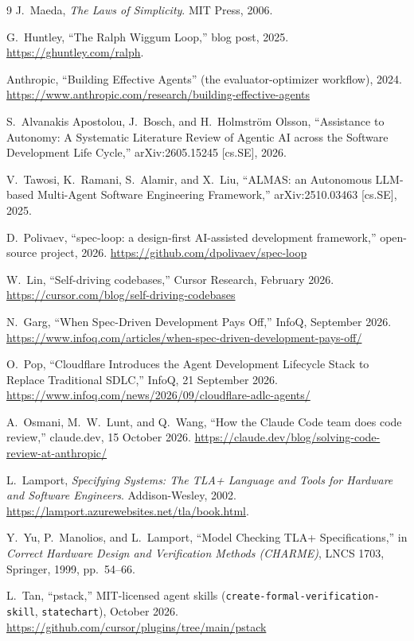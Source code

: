 \documentclass[11pt]{article}
\begin{document}
\begin{thebibliography}{9}
J.~Maeda, \emph{The Laws of Simplicity}. MIT Press, 2006.

G.~Huntley, ``The Ralph Wiggum Loop,'' blog post, 2025.
\url{https://ghuntley.com/ralph}.

Anthropic, ``Building Effective Agents'' (the evaluator-optimizer workflow),
2024. \url{https://www.anthropic.com/research/building-effective-agents}

S.~Alvanakis Apostolou, J.~Bosch, and H.~Holmstr\"om Olsson,
``Assistance to Autonomy: A Systematic Literature Review of Agentic AI across
the Software Development Life Cycle,'' arXiv:2605.15245 [cs.SE], 2026.

V.~Tawosi, K.~Ramani, S.~Alamir, and X.~Liu,
``ALMAS: an Autonomous LLM-based Multi-Agent Software Engineering Framework,''
arXiv:2510.03463 [cs.SE], 2025.

D.~Polivaev, ``spec-loop: a design-first AI-assisted development framework,''
open-source project, 2026. \url{https://github.com/dpolivaev/spec-loop}

W.~Lin, ``Self-driving codebases,'' Cursor Research, February 2026.
\url{https://cursor.com/blog/self-driving-codebases}

N.~Garg, ``When Spec-Driven Development Pays Off,'' InfoQ, September 2026.
\url{https://www.infoq.com/articles/when-spec-driven-development-pays-off/}

O.~Pop, ``Cloudflare Introduces the Agent Development Lifecycle Stack to Replace
Traditional SDLC,'' InfoQ, 21 September 2026.
\url{https://www.infoq.com/news/2026/09/cloudflare-adlc-agents/}

A.~Osmani, M.~W.~Lunt, and Q.~Wang, ``How the Claude Code team does code
review,'' claude.dev, 15 October 2026.
\url{https://claude.dev/blog/solving-code-review-at-anthropic/}

L.~Lamport, \emph{Specifying Systems: The TLA+ Language and Tools for Hardware
and Software Engineers}. Addison-Wesley, 2002.
\url{https://lamport.azurewebsites.net/tla/book.html}.

Y.~Yu, P.~Manolios, and L.~Lamport, ``Model Checking TLA+ Specifications,'' in
\emph{Correct Hardware Design and Verification Methods (CHARME)}, LNCS 1703,
Springer, 1999, pp.~54--66.

L.~Tan, ``pstack,'' MIT-licensed agent skills (\texttt{create-formal-verification-skill},
\texttt{statechart}), October 2026.
\url{https://github.com/cursor/plugins/tree/main/pstack}

\end{thebibliography}
\end{document}
